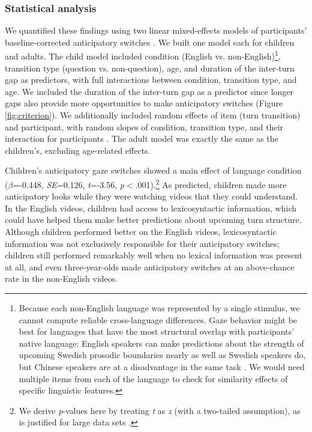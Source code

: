 \documentclass[authoryear, 12pt]{elsarticle}
\begin{document}
\subsubsection{Statistical analysis}

We quantified these findings using two linear mixed-effects models of participants' baseline-corrected anticipatory switches \citep{lme4, R}. We built one model each for children and adults. The child model included condition (English vs. non-English)\footnote{Because each non-English language was represented by a single stimulus, we cannot compute reliable cross-language differences. Gaze behavior might be best for languages that have the most structural overlap with participants' native language: English speakers can make predictions about the strength of upcoming Swedish prosodic boundaries nearly as well as Swedish speakers do, but Chinese speakers are at a disadvantage in the same task \cite{carlson2005}. We would need multiple items from each of the language to check for similarity effects of specific linguistic features.}, transition type (question vs. non-question), age, and duration of the inter-turn gap as predictors, with full interactions between condition, transition type, and age.  We included the duration of the inter-turn gap as a predictor since longer gaps also provide more opportunities to make anticipatory switches (Figure \ref{fig:criterion}). We additionally included random effects of item (turn transition) and participant, with random slopes of condition, transition type, and their interaction for participants \citep{barr2013}. The adult model was exactly the same as the children's, excluding age-related effects.

Children's anticipatory gaze switches showed a main effect of language condition (\textit{$\beta$}=-0.448, \textit{SE}=0.126, \textit{t}=-3.56, \textit{p}$<$.001).\footnote{We derive \textit{p}-values here by treating \textit{t} as \textit{z} (with a two-tailed assumption), as is justified for large data sets \citep{barr2013}.} As predicted, children made more anticipatory looks while they were watching videos that they could understand. In the English videos, children had access to lexicosyntactic information, which could have helped them make better predictions about upcoming turn structure. Although children performed better on the English videos, lexicosyntactic information was not exclusively responsible for their anticipatory switches; children still performed remarkably well when no lexical information was present at all, and even three-year-olds made anticipatory switches at an above-chance rate in the non-English videos.
\end{document}
